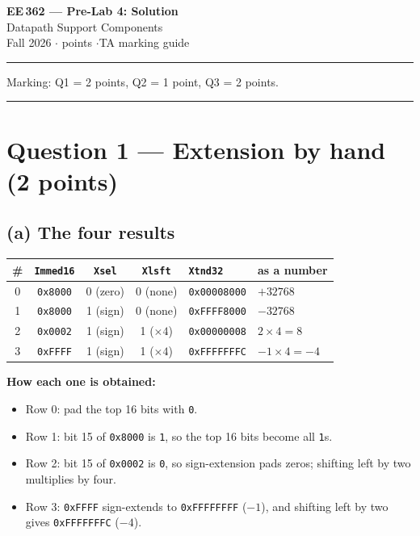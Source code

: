 \documentclass[11pt]{article}
\newcommand{\code}[1]{\texttt{#1}}
\newcommand{\hr}{\vspace{2pt}\hrule\vspace{6pt}}
\begin{document}
\begin{center}
{\Large\bfseries EE\,362 --- Pre-Lab 4: Solution}\\[2pt]
{\large Datapath Support Components}\\[4pt]
Fall 2026 \quad$\cdot$ points \quad$\cdot$\quad TA marking guide
\end{center}
\hr

{\small Marking: Q1 = 2 points, Q2 = 1 point, Q3 = 2 points.}

\vspace{4pt}\hr

\section*{Question 1 --- Extension by hand (2 points)}

\subsection*{(a) The four results}

\begin{center}
\begin{tabular}{c|ccc|l|l}
\toprule
\# & \code{Immed16} & \code{Xsel} & \code{Xlsft} & \code{Xtnd32} & as a number \\
\midrule
0 & \code{0x8000} & 0 (zero) & 0 (none) & \code{0x00008000} & $+32768$ \\
1 & \code{0x8000} & 1 (sign) & 0 (none) & \code{0xFFFF8000} & $-32768$ \\
2 & \code{0x0002} & 1 (sign) & 1 ($\times 4$) & \code{0x00000008} & $2 \times 4 = 8$ \\
3 & \code{0xFFFF} & 1 (sign) & 1 ($\times 4$) & \code{0xFFFFFFFC} & $-1 \times 4 = -4$ \\
\bottomrule
\end{tabular}
\end{center}

\textbf{How each one is obtained:}
\begin{itemize}[leftmargin=1.6em,itemsep=1pt]
\item Row 0: pad the top 16 bits with \code{0}.
\item Row 1: bit 15 of \code{0x8000} is \code{1}, so the top 16 bits become all
\code{1}s.
\item Row 2: bit 15 of \code{0x0002} is \code{0}, so sign-extension pads zeros;
shifting left by two multiplies by four.
\item Row 3: \code{0xFFFF} sign-extends to \code{0xFFFFFFFF} ($-1$), and shifting
left by two gives \code{0xFFFFFFFC} ($-4$).
\end{itemize}
\end{document}
